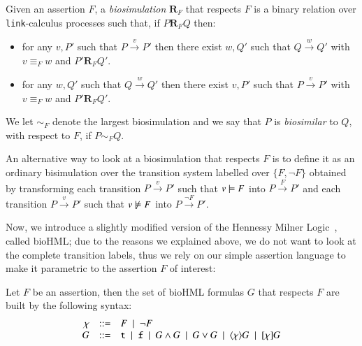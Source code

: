 \begin{definition}
Given an assertion $F$, a \emph{biosimulation} $\mathbf{R}_F$ that respects $F$ is a binary relation over {\tt link}-calculus processes such that, if $P \mathrel{\mathbf{R}_F} Q$ then:
 \begin{itemize} 
 \item
 for any $v,P'$ such that 
 $P \xrightarrow{v} P'$ then there exist $w,Q'$ such that $Q  \xrightarrow{w} Q'$ with $v\equiv_F w$ and $P' \mathrel{\mathbf{R}_F} Q'$.
\item
 for any $w,Q'$ such that 
 $Q \xrightarrow{w} Q'$ then there exist $v,P'$ such that $P  \xrightarrow{v} P'$ with $v\equiv_F w$ and $P' \mathrel{\mathbf{R}_F} Q'$.
\end{itemize}
We let $ \sim_F $ denote the largest  biosimulation and we say that $P$ is \emph{biosimilar} to $Q$, with respect to $F$, if $P \sim_F Q$.
\end{definition}

\begin{remark}
An alternative way to look at a biosimulation that respects $F$ is to define it as an ordinary bisimulation over the transition system labelled over $\{F,\neg F\}$ obtained by transforming each transition $P \xrightarrow{v} P'$ such that $v\models F$ into $P \xrightarrow{F} P'$ and  each transition $P \xrightarrow{v} P'$ such that $v\not\models F$ into $P \xrightarrow{\neg F} P'$.
\end{remark}

Now, we introduce a slightly modified version of the Hennessy Milner Logic~\cite{}, called bioHML; due to the reasons we explained above, we do not want to look at the complete transition labels, thus we rely on our simple assertion language to make it parametric to the assertion $F$ of interest:
\begin{definition}[bioHML]
Let   $F$ be an assertion, then 
the set of bioHML formulas $G$ that respects $F$ are built by the following syntax:
$$
\begin{array}{rcl}
\chi & ::= & F~\mid~ \neg F\\
G &::= &{\tt t} ~\mid~ {\tt f} ~\mid~ G\wedge G ~\mid~ G \vee G ~\mid~ \langle \chi \rangle G ~\mid~ [\chi]G
\end{array}
$$
\end{definition}

